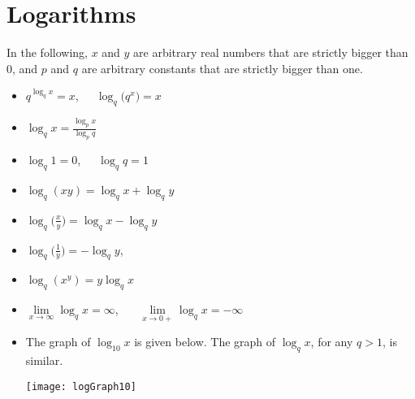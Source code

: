 \section{Logarithms}\label{sec logs}

In the following, $x$ and $y$ are arbitrary real numbers that
are strictly bigger than 0, and
$p$ and $q$ are arbitrary constants that are strictly bigger than one.

\begin{itemize}
\item   $q^{\log_q x}=x$,\ \ \
            $\log_q \big(q^x\big)=x$
\item   $\log_q x=\frac{\log_p x}{\log_p q}$
\item  $\log_q 1=0$,\ \ \
          $\log_q q=1$
\item $\log_q(xy)=\log_q x+\log_q y$
\item $\log_q\big(\frac{x}{y}\big)=\log_q x-\log_q y$
\item $\log_q\big(\frac{1}{y}\big)=-\log_q y$,
\item $\log_q(x^y)=y\log_q x$
\item $\lim\limits_{x\rightarrow\infty}\log_q x=\infty$, \ \ \
           $\lim\limits_{x\rightarrow0+}\log_q x=-\infty$
\item The graph of $\log_{10} x$ is given below. The graph of  $\log_q x$,
for any $q>1$, is similar.

\begin{center}
\texttt{[image: logGraph10]}
\end{center}

\end{itemize}



